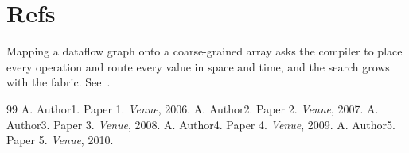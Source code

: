 \documentclass{article}
\begin{document}
\section{Refs}
Mapping a dataflow graph onto a coarse-grained array asks the compiler to place every operation and route every value in space and time, and the search grows with the fabric. See~\cite{k01,k02,k03}.

\begin{thebibliography}{99}
 A. Author1. Paper 1. \emph{Venue}, 2006.
 A. Author2. Paper 2. \emph{Venue}, 2007.
 A. Author3. Paper 3. \emph{Venue}, 2008.
 A. Author4. Paper 4. \emph{Venue}, 2009.
 A. Author5. Paper 5. \emph{Venue}, 2010.
\end{thebibliography}
\end{document}
